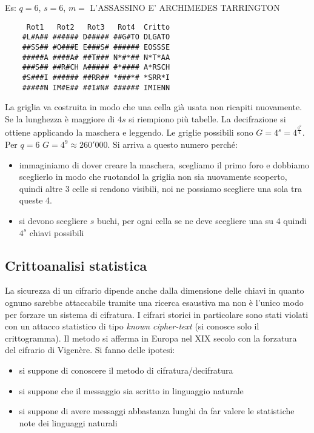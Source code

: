 Es: $q = 6$, $s = 6$, $m = $ L'ASSASSINO E' ARCHIMEDES TARRINGTON
\begin{verbatim}
     Rot1   Rot2   Rot3   Rot4  Critto
    #L#A## ###### D##### ##G#TO DLGATO
    ##SS## #O###E E###S# ###### EOSSSE
    #####A ####A# ##T### N*#*## N*T*AA
    ###S## ##R#CH A##### #*#### A*RSCH
    #S###I ###### ##RR## *###*# *SRR*I
    #####N IM#E## ##I#N# ###### IMIENN
\end{verbatim}

La griglia va costruita in modo che una cella già usata non ricapiti nuovamente. Se la lunghezza è maggiore di $4s$ si riempiono più tabelle. La decifrazione si ottiene applicando la maschera e leggendo. Le griglie possibili sono $G = 4^s = 4^{\frac{q^2}{4}}$. Per $q=6$ $G = 4^9 \approx 260'000$. Si arriva a questo numero perché:
\begin{itemize}
    \item immaginiamo di dover creare la maschera, scegliamo il primo foro e dobbiamo sceglierlo in modo che ruotandol la griglia non sia nuovamente scoperto, quindi altre 3 celle si rendono visibili, noi ne possiamo scegliere una sola tra queste 4.
    \item si devono scegliere $s$ buchi, per ogni cella se ne deve scegliere una su 4 quindi $4^s$ chiavi possibili
\end{itemize}

\subsection{Crittoanalisi statistica}
La sicurezza di un cifrario dipende anche dalla dimensione delle chiavi in quanto ognuno sarebbe attaccabile tramite una ricerca esaustiva ma non è l'unico modo per forzare un sistema di cifratura. I cifrari storici in particolare sono stati violati con un attacco statistico di tipo \emph{known cipher-text} (si conosce solo il crittogramma). Il metodo si afferma in Europa nel XIX secolo con la forzatura del cifrario di Vigenère.
Si fanno delle ipotesi:
\begin{itemize}
    \item si suppone di conoscere il metodo di cifratura/decifratura
    \item si suppone che il messaggio sia scritto in linguaggio naturale
    \item si suppone di avere messaggi abbastanza lunghi da far valere le statistiche note dei linguaggi naturali
\end{itemize}

